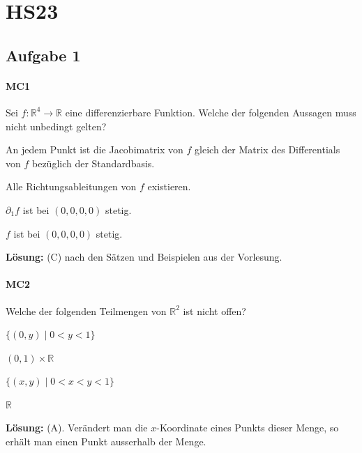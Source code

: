 \documentclass[a4paper,10pt]{article}
\def\R{\mathbb{R}}
\begin{document}
\section{HS23}
\scriptsize
{

\subsection{Aufgabe 1}

\paragraph{MC1} Sei \( f: \R^4 \to \R \) eine differenzierbare Funktion. Welche der folgenden Aussagen muss nicht unbedingt gelten?
\begin{enumerate*}
    \item An jedem Punkt ist die Jacobimatrix von \( f \) gleich der Matrix des Differentials von \( f \) bezüglich der Standardbasis.
    \item Alle Richtungsableitungen von \( f \) existieren.
    \item \( \partial_1 f \) ist bei \( (0, 0, 0, 0) \) stetig.
    \item \( f \) ist bei \( (0, 0, 0, 0) \) stetig.
\end{enumerate*}
\textbf{Lösung:} (C) nach den Sätzen und Beispielen aus der Vorlesung.

\paragraph{MC2} Welche der folgenden Teilmengen von \( \R^2 \) ist nicht offen?
\begin{enumerate*}
    \item \( \{ (0, y) \mid 0 < y < 1 \} \)
    \item \( (0, 1) \times \R \)
    \item \( \{ (x, y) \mid 0 < x < y < 1 \} \)
    \item \( \R \)
\end{enumerate*}
\textbf{Lösung:} (A). Verändert man die \( x \)-Koordinate eines Punkts dieser Menge, so erhält man einen Punkt ausserhalb der Menge.

}
\end{document}
